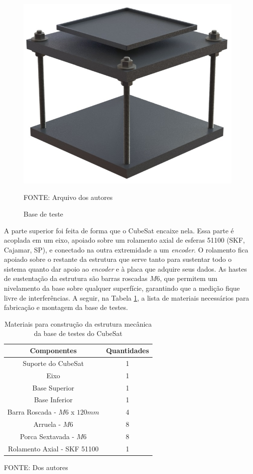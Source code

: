 \documentclass[
	12pt,				%
	openany,			%
	twoside,			%
	a4paper,			%
	english,			%
	french,				%
	spanish,			%
	brazil,				%
	oldfontcommands
	]{abntex2}
\begin{document}
\begin{figure}[th]
	\caption{Base de teste}
	\centering
	\includegraphics[width=0.6\linewidth]{./figs/Test_Base}
	
	\begin{small}
		FONTE: Arquivo dos autores
	\end{small}
	\label{fig:ProtoTB}
\end{figure}

\newpage

A parte superior foi feita de forma que o CubeSat encaixe nela. Essa parte é acoplada em um eixo, apoiado sobre um rolamento axial de esferas 51100 (SKF, Cajamar, SP), e conectado na outra extremidade a um \textit{encoder}. O rolamento fica apoiado sobre o restante da estrutura que serve tanto para sustentar todo o sistema quanto dar apoio ao \textit{encoder} e à placa que adquire seus dados. As hastes de sustentação da estrutura são barras roscadas $M6$, que permitem um nivelamento da base sobre qualquer superfície, garantindo que a medição fique livre de interferências. A seguir, na Tabela \ref{tab:MatTB}, a lista de materiais necessários para fabricação e montagem da base de testes.

\begin{table}[h]
	\caption{Materiais para construção da estrutura mecânica da base de testes do CubeSat}
		\centering
	\begin{tabular}{|c|c|}
		\hline
		\textbf{Componentes} & \textbf{Quantidades} \\ 
		\hline 
		Suporte do CubeSat & 1 \\ 
		\hline 
		Eixo & 1 \\
		\hline
		Base Superior & 1 \\ 
		\hline 
		Base Inferior & 1 \\
		\hline 
		Barra Roscada - $M6$ x $120mm$ & 4 \\
		\hline 
		Arruela - $M6$ & 8 \\ 
		\hline 
		Porca Sextavada - $M6$ & 8 \\ 
		\hline 
		Rolamento Axial - SKF 51100 & 1 \\
		\hline
	\end{tabular}
	
	\begin{small}
	\vspace{3pt}	
	FONTE: Dos autores
	\end{small}
	\label{tab:MatTB}
\end{table}
\end{document}
